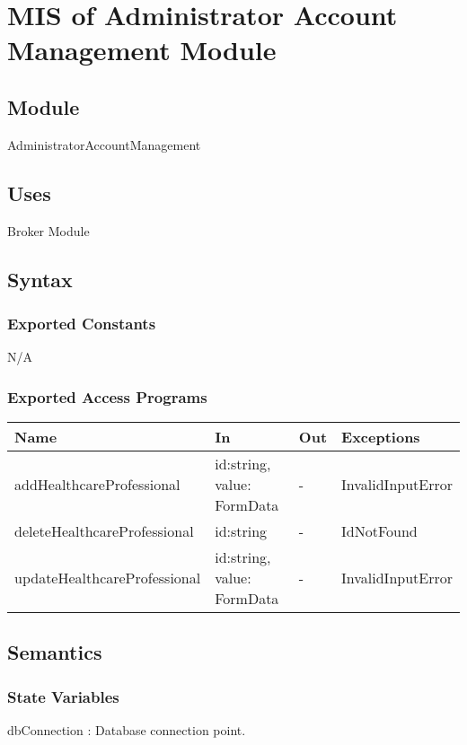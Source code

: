 \documentclass[12pt, titlepage]{article}
\begin{document}
\newpage

\section{MIS of Administrator Account Management Module} \label{Module_AdminAccount}

\subsection{Module}
AdministratorAccountManagement

\subsection{Uses}
Broker Module\\

\subsection{Syntax}

\subsubsection{Exported Constants}
N/A

\subsubsection{Exported Access Programs}

\begin{center}
\begin{tabular}{p{4cm} p{4.5cm} p{1cm} p{2.5cm}}
\hline
\textbf{Name} & \textbf{In} & \textbf{Out} & \textbf{Exceptions} \\
\hline
addHealthcareProfessional & id:string, value: FormData & - & InvalidInputError \\
deleteHealthcareProfessional & id:string & - & IdNotFound\\
updateHealthcareProfessional & id:string, value: FormData & - & InvalidInputError \\
\hline
\end{tabular}
\end{center}

\subsection{Semantics}

\subsubsection{State Variables}
dbConnection : Database connection point.
\end{document}
